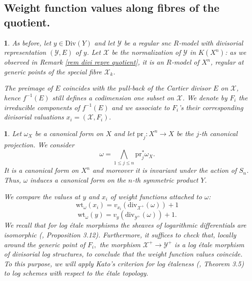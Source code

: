 \documentclass{amsart}%
\numberwithin{equation}{subsection}
\theoremstyle{plain2}
\theoremstyle{definition2}
\theoremstyle{stepstyle}
\theoremstyle{point}
\theoremstyle{subpoint}
\newtheorem{subpoint}[equation]{}%
\newcommand{\spa}[1]{\begin{subpoint}#1\end{subpoint}}           %
\newcommand{\cX}{\ensuremath{\mathscr{X}}}
\newcommand{\cY}{\ensuremath{\mathscr{Y}}}
\renewcommand{\cY}{\ensuremath{\mathscr{Y}}}
\newcommand{\pr}{\mathrm{pr}}
\newcommand{\divisor}{\mathrm{div}}
\newcommand{\weight}{\mathrm{wt}}
\begin{document}
\subsection{Weight function values along fibres of the quotient.} \label{paragraph weight values on fibres}
\spa{As before, let $y \in \text{Div}(Y)$ and let $\cY$ be a regular snc $R$-model with divisorial representation $(\cY,E)$ of $y$. %
Let $\cX$ be the normalization of $\cY$ in $K(X^n)$: as we observed in Remark \ref{rem divi repre quotient}, it is an $R$-model of $X^n$, regular at generic points of the special fibre $\cX_k$.

The preimage of $E$ coincides with the pull-back of the Cartier divisor $E$ on $\cX$, hence $f^{-1}(E)$ still defines a codimension one subset on $\cX$. We denote by $F_i$ the irreducible components of $f^{-1}(E)$ %
and we associate to $F_i$'s their corresponding divisorial valuations $x_i=(\cX,F_i)$.
}

\spa{Let $\omega_X$ be a canonical form on $X$ and let $\pr_j:X^n \rightarrow X$ be the $j$-th canonical projection. We consider $$\omega= \bigwedge_{1\leqslant j \leqslant n} \pr_j^*\omega_X.$$ It is a canonical form on $X^n$ and moreover it is invariant under the action of $S_n$. Thus, $\omega$ induces a canonical form on the $n$-th symmetric product $Y$.


We compare the values at $y$ and $x_i$ of weight functions attached to $\omega$:
$$\weight_{\omega}(x_i)=v_{x_i}(\divisor_{\cX^+}(\omega)) +1 $$
$$\weight_{\omega}(y)=v_{y}(\divisor_{\cY^+}(\omega)) +1. $$ We recall that for log \'{e}tale morphisms the sheaves of logarithmic differentials are isomorphic (\cite{Kato1994a}, Proposition 3.12). Furthermore, it suffices to check that, locally around the generic point of $F_i,$ the morphism $\cX^+ \rightarrow \cY^+$ is a log \'{e}tale morphism of divisorial log structures, to conclude that the weight function values coincide. To this purpose, we will apply Kato's criterion for log \'{e}taleness (\cite{Kato1989}, Theorem 3.5) to log schemes with respect to the \'{e}tale topology.
}
\end{document}
